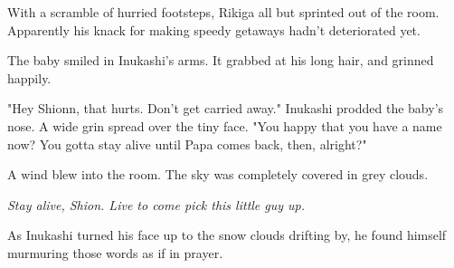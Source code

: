 With a scramble of hurried footsteps, Rikiga all but sprinted out of the
room. Apparently his knack for making speedy getaways hadn't
deteriorated yet.

The baby smiled in Inukashi's arms. It grabbed at his long hair, and
grinned happily.

"Hey Shionn, that hurts. Don't get carried away." Inukashi prodded the
baby's nose. A wide grin spread over the tiny face. "You happy that you
have a name now? You gotta stay alive until Papa comes back, then,
alright?"

A wind blew into the room. The sky was completely covered in grey
clouds.

\emph{Stay alive, Shion. Live to come pick this little guy up.}

As Inukashi turned his face up to the snow clouds drifting by, he found
himself murmuring those words as if in prayer.